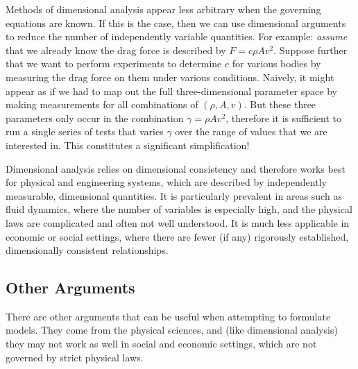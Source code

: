Methods of dimensional analysis appear less arbitrary when the
governing equations are known. If this is the case, then we can use
dimensional arguments to reduce the number of independently variable
quantities.  For example: \emph{assume} that we already know the drag
force is described by $F = c \rho A v^2$. Suppose  further that we want
to perform experiments to determine $c$ for various bodies by
measuring the drag force on them under various conditions. Naively, it
might appear\vadjust{\pagebreak} as if we had to map out the full three-dimensional
parameter space by making measurements for all combinations of $(\rho,
A, v)$. But these three parameters only occur in the combination
$\gamma = \rho A v^2$, therefore it is sufficient to run a single
series of tests that varies $\gamma$ over the range of values that we
are interested in. This constitutes a significant simplification!

Dimensional analysis relies on dimensional consistency and therefore
works best for physical and engineering systems, which are described
by independently measurable, dimensional quantities.  It is
particularly prevalent in areas such as fluid dynamics, where the
number of variables is especially high, and the physical laws are
complicated and often not well understood. It is much less applicable
in economic or social settings, where there are fewer (if any)
rigorously established, dimensionally consistent relationships.

\subsection{Other Arguments}

There are other arguments that can be useful when attempting to
formulate models. They come from the physical sciences, and (like
dimensional analysis) they may not work as well in social and economic
settings, which are not governed by strict physical laws.\vspace*{6pt}

